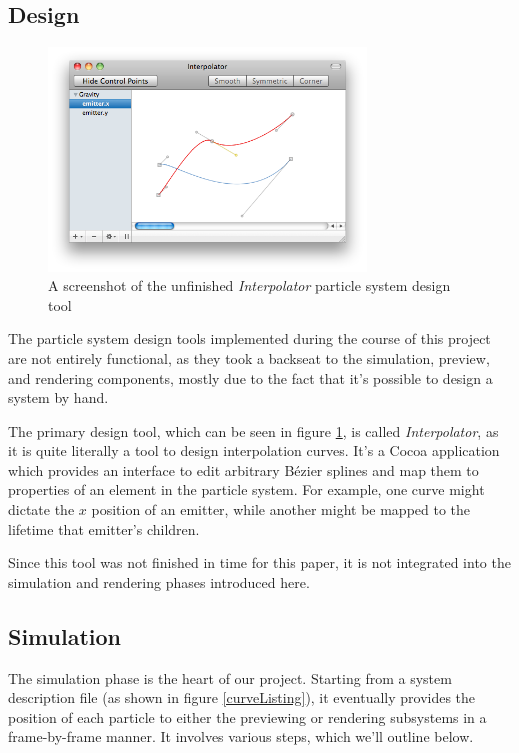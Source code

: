 \documentclass{acmsiggraph}
\begin{document}
\subsection{Design}

\begin{figure}
    \includegraphics[width=84.5mm]{interpolator.png}
    \caption{A screenshot of the unfinished {\it Interpolator} particle system design tool}
    \label{fig:interpolator}
\end{figure}

The particle system design tools implemented during the course of this project are not entirely functional, as they took a backseat to the simulation, preview, and rendering components, mostly due to the fact that it's possible to design a system by hand.

The primary design tool, which can be seen in figure \ref{fig:interpolator}, is called {\it Interpolator}, as it is quite literally a tool to design interpolation curves. It's a Cocoa application which provides an interface to edit arbitrary B\'{e}zier splines and map them to properties of an element in the particle system. For example, one curve might dictate the $x$ position of an emitter, while another might be mapped to the lifetime that emitter's children.

Since this tool was not finished in time for this paper, it is not integrated into the simulation and rendering phases introduced here.

\subsection{Simulation}

The simulation phase is the heart of our project. Starting from a system description file (as shown in figure \ref{curveListing}), it eventually provides the position of each particle to either the previewing or rendering subsystems in a frame-by-frame manner. It involves various steps, which we'll outline below.
\end{document}

